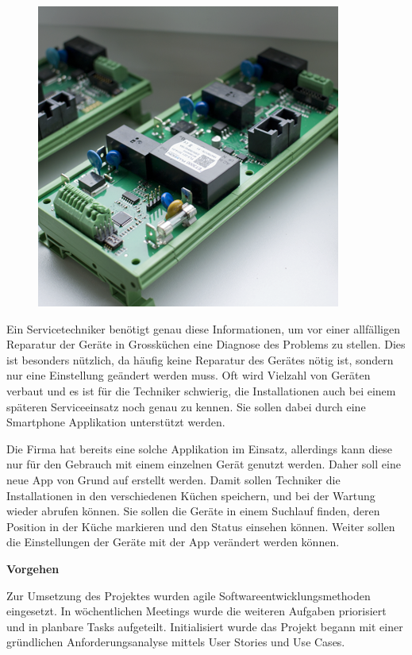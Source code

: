 \begin{figure}
	\vspace{-0.5cm}
	\begin{center}
		\includegraphics[scale=1]{start/img/img_7689}
	\end{center}
	\vspace{-0.5cm}
\end{figure}

Ein Servicetechniker benötigt genau diese Informationen, um vor einer allfälligen Reparatur der Geräte in Grossküchen eine Diagnose des Problems zu stellen. Dies ist besonders nützlich, da häufig keine Reparatur des Gerätes nötig ist, sondern nur eine Einstellung geändert werden muss. Oft wird Vielzahl von Geräten verbaut und es ist für die Techniker schwierig, die Installationen auch bei einem späteren Serviceeinsatz noch genau zu kennen. Sie sollen dabei durch eine Smartphone Applikation unterstützt werden.

Die Firma hat bereits eine solche Applikation im Einsatz, allerdings kann diese nur für den Gebrauch mit einem einzelnen Gerät genutzt werden. Daher soll eine neue App von Grund auf erstellt werden. Damit sollen Techniker die Installationen in den verschiedenen Küchen speichern, und bei der Wartung wieder abrufen können. Sie sollen die Geräte in einem Suchlauf finden, deren Position in der Küche markieren und den Status einsehen können. Weiter sollen die Einstellungen der Geräte mit der App verändert werden können.

\textbf{Vorgehen}

Zur Umsetzung des Projektes wurden agile Softwareentwicklungsmethoden eingesetzt. In  wöchentlichen Meetings wurde die weiteren Aufgaben priorisiert und in planbare Tasks aufgeteilt. Initialisiert wurde das Projekt begann mit einer gründlichen Anforderungsanalyse mittels User Stories und Use Cases. 

